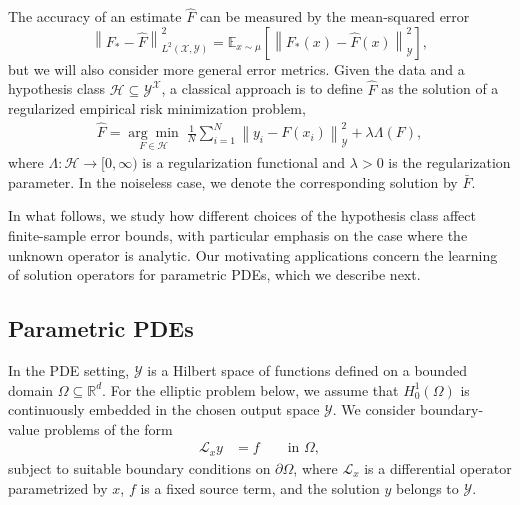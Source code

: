 \documentclass[11pt]{article}
\numberwithin{equation}{section}
\theoremstyle{plain}
\theoremstyle{definition}
\theoremstyle{remark}
\newcommand{\EXP}{\mathbb{E}}
\newcommand{\norm}[1]{\left\lVert#1\right\rVert}
\begin{document}
The accuracy of an estimate $\hat F$ can be measured by the mean-squared error
\begin{equation}\label{eq:l2_error}
\norm{F_*-\hat{F}}_{L^2(\mathcal{X},\mathcal{Y})}^2
=
\EXP_{x\sim\mu}
\left[\norm{F_*(x)-\hat{F}(x)}_{\mathcal{Y}}^2\right],
\end{equation}
but we will also consider more general error metrics.
Given the data and a hypothesis class
$\mathcal{H}\subseteq\mathcal{Y}^{\mathcal{X}}$, a classical approach is to
define $\hat{F}$ as the solution of a regularized empirical risk minimization
problem,
\begin{align} \label{gen_erm}
\hat{F}
=
\underset{F\in\mathcal{H}}{\arg\min}\;
\frac{1}{N}\sum_{i=1}^N
\left\|y_i-F(x_i)\right\|_{\mathcal{Y}}^2
+\lambda\Lambda(F),
\end{align}
where $\Lambda\colon\mathcal{H}\to[0,\infty)$ is a regularization functional
and $\lambda>0$ is the regularization parameter. In the noiseless case, we
denote the corresponding solution by $\bar{F}$.

In what follows, we study how different choices of the hypothesis class affect
finite-sample error bounds, with particular emphasis on the case where the
unknown operator is analytic. Our motivating applications concern the learning
of solution operators for parametric PDEs, which we describe next.

\subsection{Parametric PDEs}\label{sub:parametricPDE}

In the PDE setting, $\mathcal{Y}$ is a Hilbert space of functions defined on a
bounded domain $\Omega\subseteq\mathbb{R}^d$. For the elliptic problem below,
we assume that $H_0^1(\Omega)$ is continuously embedded in the chosen output
space $\mathcal{Y}$. We consider boundary-value problems of the form
\begin{align*}
\mathcal{L}_x y &= f \qquad \text{in } \Omega,
\end{align*}
subject to suitable boundary conditions on $\partial\Omega$, where
$\mathcal{L}_x$ is a differential operator parametrized by $x$, $f$ is a
fixed source term, and the solution $y$ belongs to $\mathcal{Y}$.
\end{document}
